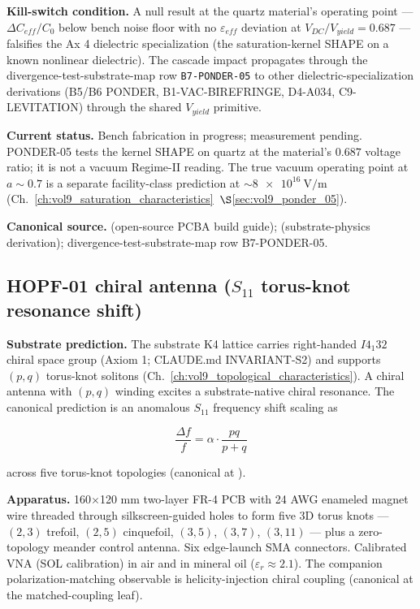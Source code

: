 \textbf{Kill-switch condition.} A null result at the quartz material's operating point --- $\Delta C_{eff}/C_0$ below bench noise floor with no $\varepsilon_{eff}$ deviation at $V_{DC}/V_{yield} = 0.687$ --- falsifies the Ax 4 dielectric specialization (the saturation-kernel SHAPE on a known nonlinear dielectric). The cascade impact propagates through the divergence-test-substrate-map row \texttt{B7-PONDER-05} to other dielectric-specialization derivations (B5/B6 PONDER, B1-VAC-BIREFRINGE, D4-A034, C9-LEVITATION) through the shared $V_{yield}$ primitive.

\textbf{Current status.} Bench fabrication in progress; measurement pending. PONDER-05 tests the kernel SHAPE on quartz at the material's $0.687$ voltage ratio; it is not a vacuum Regime-II reading. The true vacuum operating point at $a \sim 0.7$ is a separate facility-class prediction at $\sim\qty{8e16}{\volt\per\metre}$ (Ch.~\ref{ch:vol9_saturation_characteristics}~$\S$\ref{sec:vol9_ponder_05}).

\textbf{Canonical source.}  (open-source PCBA build guide);  (substrate-physics derivation); divergence-test-substrate-map row B7-PONDER-05.

\subsection{HOPF-01 chiral antenna ($S_{11}$ torus-knot resonance shift)}
\label{subsec:vol9_hopf_01}

\textbf{Substrate prediction.} The substrate K4 lattice carries right-handed $I4_1 32$ chiral space group (Axiom 1; CLAUDE.md INVARIANT-S2) and supports $(p,q)$ torus-knot solitons (Ch.~\ref{ch:vol9_topological_characteristics}). A chiral antenna with $(p,q)$ winding excites a substrate-native chiral resonance. The canonical prediction is an anomalous $S_{11}$ frequency shift scaling as

\begin{equation}
    \frac{\Delta f}{f} = \alpha \cdot \frac{pq}{p+q}
    \label{eq:vol9_hopf01_shift}
\end{equation}

across five torus-knot topologies (canonical at ).

\textbf{Apparatus.} 160$\times$120 mm two-layer FR-4 PCB with 24 AWG enameled magnet wire threaded through silkscreen-guided holes to form five 3D torus knots --- $(2,3)$ trefoil, $(2,5)$ cinquefoil, $(3,5)$, $(3,7)$, $(3,11)$ --- plus a zero-topology meander control antenna. Six edge-launch SMA connectors. Calibrated VNA (SOL calibration) in air and in mineral oil ($\varepsilon_r \approx 2.1$). The companion polarization-matching observable is helicity-injection chiral coupling (canonical at the matched-coupling leaf).


